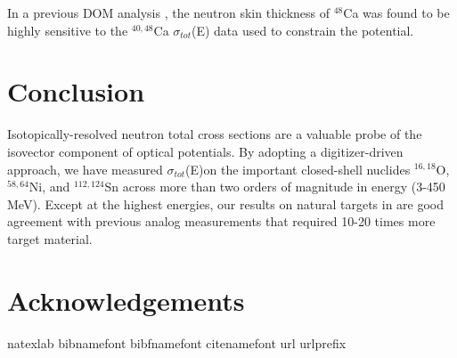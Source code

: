 \documentclass[twocolumn,secnumarabic,amssymb, nobibnotes, aps, prl,
superscriptaddress, nobalancelastpage]{revtex4}
\newcommand{\totE}{\ensuremath{\sigma_{tot}}(E)}
\newcommand{\totEs}{\ensuremath{\sigma_{tot}}(E)\,\,}
\begin{document}
In a previous DOM analysis \cite{}, the neutron skin thickness of $^{48}$Ca was
found to be highly sensitive to the $^{40,48}$Ca \totEs data used to constrain
the potential. 

\section{Conclusion}
Isotopically-resolved neutron total cross sections are a valuable probe of the
isovector component of optical potentials. By adopting a digitizer-driven
approach, we have measured \totE on the important closed-shell nuclides
$^{16,18}$O, $^{58,64}$Ni, and $^{112,124}$Sn across more than two orders of
magnitude in energy (3-450 MeV). Except at the highest energies, our results
on natural targets in are good agreement with previous analog measurements
that required 10-20 times more target material. 

\section{Acknowledgements}


\begin{thebibliography}{32} \expandafter\ifx\csname
        natexlab\endcsname\relax\def\natexlab#1{#1}\fi \expandafter\ifx\csname
        bibnamefont\endcsname\relax \def\bibnamefont#1{#1}\fi
        \expandafter\ifx\csname bibfnamefont\endcsname\relax
        \def\bibfnamefont#1{#1}\fi \expandafter\ifx\csname
        citenamefont\endcsname\relax \def\citenamefont#1{#1}\fi
        \expandafter\ifx\csname url\endcsname\relax \def\url#1{\texttt{#1}}\fi
        \expandafter\ifx\csname urlprefix\endcsname\relax\def\urlprefix{URL
        }\fi \providecommand{\bibinfo}[2]{#2}
        \providecommand{\eprint}[2][]{\url{#2}}

\end{thebibliography}
\end{document}
